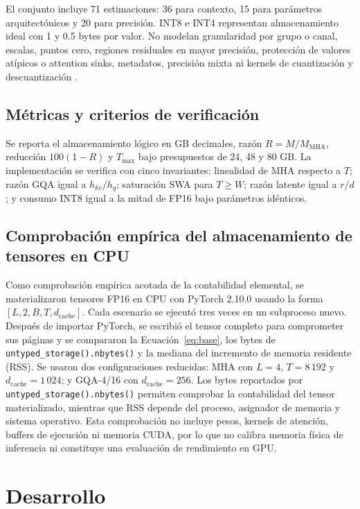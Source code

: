\documentclass[a4paper,twocolumn]{article}
\begin{document}
El conjunto incluye 71 estimaciones: 36 para contexto, 15 para parámetros arquitectónicos y 20 para precisión. INT8 e INT4 representan almacenamiento ideal con 1 y 0.5 bytes por valor. No modelan granularidad por grupo o canal, escalas, puntos cero, regiones residuales en mayor precisión, protección de valores atípicos o attention sinks, metadatos, precisión mixta ni kernels de cuantización y descuantización \cite{liu2024kivi,duanmu2024skvq}.

\subsection{Métricas y criterios de verificación}
Se reporta el almacenamiento lógico en GB decimales, razón $R=M/M_{\mathrm{MHA}}$, reducción $100(1-R)$ y $T_{\max}$ bajo presupuestos de 24, 48 y 80 GB. La implementación se verifica con cinco invariantes: linealidad de MHA respecto a $T$; razón GQA igual a $h_{kv}/h_q$; saturación SWA para $T\ge W$; razón latente igual a $r/d$; y consumo INT8 igual a la mitad de FP16 bajo parámetros idénticos.

\subsection{Comprobación empírica del almacenamiento de tensores en CPU}
Como comprobación empírica acotada de la contabilidad elemental, se materializaron tensores FP16 en CPU con PyTorch 2.10.0 usando la forma $[L,2,B,T,d_{\mathrm{cache}}]$. Cada escenario se ejecutó tres veces en un subproceso nuevo. Después de importar PyTorch, se escribió el tensor completo para comprometer sus páginas y se compararon la Ecuación~\eqref{eq:base}, los bytes de \texttt{untyped\_storage().nbytes()} y la mediana del incremento de memoria residente (RSS). Se usaron dos configuraciones reducidas: MHA con $L=4$, $T=8\,192$ y $d_{\mathrm{cache}}=1\,024$; y GQA-4/16 con $d_{\mathrm{cache}}=256$. Los bytes reportados por \texttt{untyped\_storage().nbytes()} permiten comprobar la contabilidad del tensor materializado, mientras que RSS depende del proceso, asignador de memoria y sistema operativo. Esta comprobación no incluye pesos, kernels de atención, buffers de ejecución ni memoria CUDA, por lo que no calibra memoria física de inferencia ni constituye una evaluación de rendimiento en GPU.

\section{Desarrollo}
\end{document}
